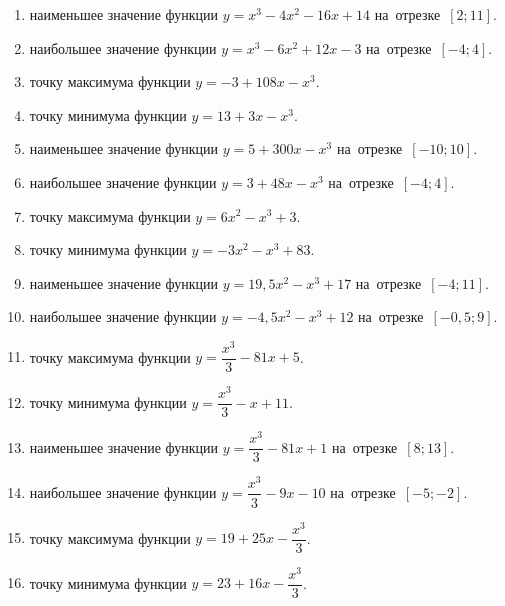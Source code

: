 \documentclass[a4paper,10pt]{article}
\begin{document}
\begin{enumerate}
\item {} наименьшее значение функции $y=x^3 -4x^2-16x+14$ на~отрезке~$\left[2;11\right]$.

\item {} наибольшее значение функции $y=x^3 -6x^2+12x-3$ на~отрезке~$\left[-4;4\right]$.

\item {} точку максимума функции $y=-3+108x-x^3$.

\item {} точку минимума функции $y=13+3x-x^3$.

\item {} наименьшее значение функции $y=5+300x-x^3$ на~отрезке~$\left[-10;10\right]$.

\item {} наибольшее значение функции $y=3+48x-x^3$ на~отрезке~$\left[-4;4\right]$.

\item {} точку максимума функции $y=6x^2-x^3+3$.

\item {} точку минимума функции $y=-3x^2-x^3+83$.

\item {} наименьшее значение функции $y=19,5x^2-x^3+17$ на~отрезке~$\left[-4;11\right]$.

\item {} наибольшее значение функции $y=-4,5x^2-x^3+12$ на~отрезке~$\left[-0,5;9\right]$.

\item {} точку максимума функции $y=\dfrac{x^3}{3} -81x+5$.

\item {} точку минимума функции $y=\dfrac{x^3}{3} -x+11$.

\item {} наименьшее значение функции $y=\dfrac{x^3}{3} -81x+1$ на~отрезке~$\left[8;13\right]$.

\item {} наибольшее значение функции $y=\dfrac{x^3}{3} -9x-10$ на~отрезке~$\left[-5;-2\right]$.

\item {} точку максимума функции $y=19 +25x-\dfrac{x^3}{3}$.

\item {} точку минимума функции $y=23 +16x-\dfrac{x^3}{3}$.


\end{enumerate}
\end{document}
